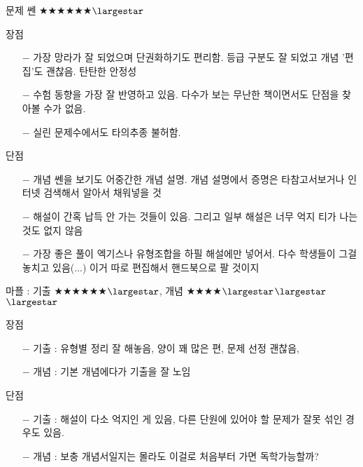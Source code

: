 문제 쎈 $\bigstar$$\bigstar$$\bigstar$$\bigstar$$\bigstar$$\bigstar$$\largestar$
\vspace{5mm}

장점

\begin{itemize}
    \item[$-$] 가장 망라가 잘 되었으며 단권화하기도 편리함. 등급 구분도 잘 되었고 개념 '편집'도 괜찮음. 탄탄한 안정성
    \item[$-$] 수험 동향을 가장 잘 반영하고 있음. 다수가 보는 무난한 책이면서도 단점을 찾아볼 수가 없음.
    \item[$-$] 실린 문제수에서도 타의추종 불허함.
\end{itemize}

\vspace{5mm}

단점
\begin{itemize}
    \item[$-$] 개념 쎈을 보기도 어중간한 개념 설명. 개념 설명에서 증명은 타참고서보거나 인터넷 검색해서 알아서 채워넣을 것
    \item[$-$] 해설이 간혹 납득 안 가는 것들이 있음. 그리고 일부 해설은 너무 억지 티가 나는 것도 없지 않음
    \item[$-$] 가장 좋은 풀이 엑기스나 유형조합을 하필 해설에만 넣어서. 다수 학생들이 그걸 놓치고 있음(...) 이거 따로 편집해서 핸드북으로 팔 것이지
\end{itemize}
\vspace{5mm}

마플 : 기출 $\bigstar$$\bigstar$$\bigstar$$\bigstar$$\bigstar$$\bigstar$$\largestar$, 개념 $\bigstar$$\bigstar$$\bigstar$$\bigstar$$\largestar$$\largestar$$\largestar$
\vspace{5mm}

장점
\begin{itemize}
    \item[$-$] 기출 : 유형별 정리 잘 해놓음, 양이 꽤 많은 편, 문제 선정 괜찮음,
    \item[$-$] 개념 : 기본 개념에다가 기출을 잘 노임
\end{itemize}

\vspace{5mm}

단점
\begin{itemize}
    \item[$-$] 기출 : 해설이 다소 억지인 게 있음, 다른 단원에 있어야 할 문제가 잘못 섞인 경우도 있음.
    \item[$-$] 개념 : 보충 개념서일지는 몰라도 이걸로 처음부터 가면 독학가능할까?
\end{itemize}
\vspace{5mm}

